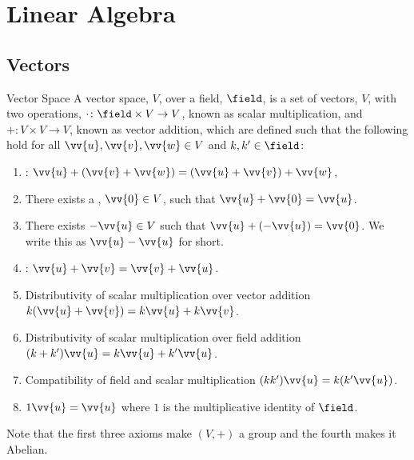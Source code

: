 \section{Linear Algebra}
\subsection{Vectors}
\begin{dfn}{Vector Space}{}
    A vector space, \(V\), over a field, \(\field\), is a set of vectors, \(V\), with two operations, \(\cdot\colon \field \times V \to V\), known as scalar multiplication, and \(+\colon V\times V \to V\), known as vector addition, which are defined such that the following hold for all \(\vv{u}, \vv{v}, \vv{w} \in V\) and \(k, k' \in \field\):
    \begin{enumerate}
        \item {}: \(\vv{u} + (\vv{v} + \vv{w}) = (\vv{u} + \vv{v}) + \vv{w}\),
        \item There exists a , \(\vv{0} \in V\), such that \(\vv{u} + \vv{0} = \vv{u}\).
        \item There exists \(-\vv{u} \in V\) such that \(\vv{u} + (-\vv{u}) = \vv{0}\).
        We write this as \(\vv{u} - \vv{u}\) for short.
        \item {}: \(\vv{u} + \vv{v} = \vv{v} + \vv{u}\).
        \item Distributivity of scalar multiplication over vector addition \(k(\vv{u} + \vv{v}) = k\vv{u} + k\vv{v}\).
        \item Distributivity of scalar multiplication over field addition \((k + k')\vv{u} = k\vv{u} + k'\vv{u}\).
        \item Compatibility of field and scalar multiplication \((kk')\vv{u} = k(k'\vv{u})\).
        \item \(1\vv{u} = \vv{u}\) where \(1\) is the multiplicative identity of \(\field\).
    \end{enumerate}
    Note that the first three axioms make \((V, +)\) a group and the fourth makes it Abelian.
\end{dfn}

